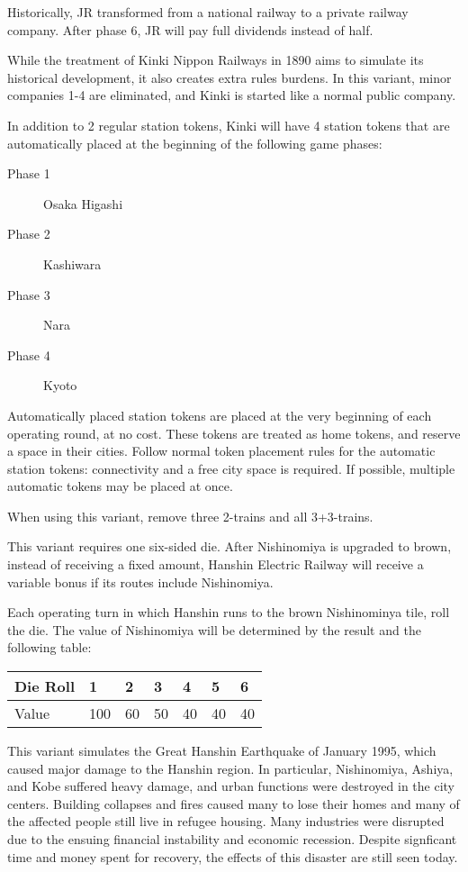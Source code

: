 \begin{multicols}{2}
\begin{itemize}
\end{itemize}

Historically, JR transformed from a national railway to a private
railway company. After phase 6, JR will pay full dividends instead of
half.

 \label{kinki-variant}
While the treatment of Kinki Nippon Railways in 1890 aims to simulate
its historical development, it also creates extra rules burdens. In
this variant, minor companies 1-4 are eliminated, and Kinki is started
like a normal public company.

In addition to 2 regular station tokens, Kinki will have 4 station
tokens that are automatically placed at the beginning of the following
game phases:

\begin{description}
\item[Phase 1] Osaka Higashi
\item[Phase 2] Kashiwara
\item[Phase 3] Nara
\item[Phase 4] Kyoto
\end{description}

Automatically placed station tokens are placed at the very beginning
of each operating round, at no cost. These tokens are treated as home
tokens, and reserve a space in their cities.  Follow normal token
placement rules for the automatic station tokens: connectivity and a
free city space is required. If possible, multiple automatic tokens
may be placed at once.

When using this variant, remove three 2-trains and all 3+3-trains.

This variant requires one six-sided die. After Nishinomiya is upgraded
to brown, instead of receiving a fixed amount, Hanshin Electric
Railway will receive a variable bonus if its routes include
Nishinomiya.

Each operating turn in which Hanshin runs to the brown Nishinominya
tile, roll the die. The value of Nishinomiya will be determined by the
result and the following table:

\begin{tabular}{l|llllll}
Die Roll & 1 & 2 & 3 & 4 & 5 & 6 \\
\hline
Value & 100 & 60 & 50 & 40 & 40 & 40 \\
\end{tabular}

This variant simulates the Great Hanshin Earthquake of January 1995,
which caused major damage to the Hanshin region. In particular,
Nishinomiya, Ashiya, and Kobe suffered heavy damage, and urban
functions were destroyed in the city centers. Building collapses and
fires caused many to lose their homes and many of the affected people
still live in refugee housing. Many industries were disrupted due to
the ensuing financial instability and economic recession. Despite
signficant time and money spent for recovery, the effects of this
disaster are still seen today.


\end{multicols}
